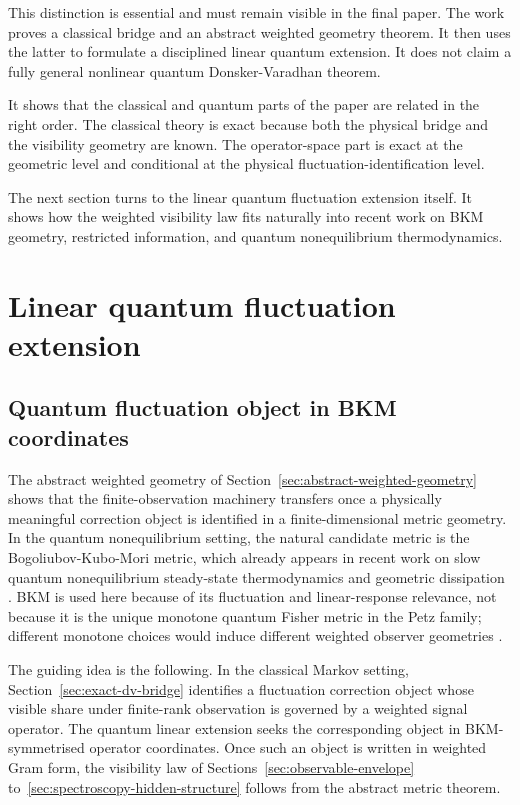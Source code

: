 \documentclass[11pt,a4paper]{article}
\numberwithin{equation}{section}
\theoremstyle{thmcompact}
\theoremstyle{remark}
\begin{document}
This distinction is essential and must remain visible in the final paper. The work proves a classical bridge and an abstract weighted geometry theorem. It then uses the latter to formulate a disciplined linear quantum extension. It does not claim a fully general nonlinear quantum Donsker-Varadhan theorem.

It shows that the classical and quantum parts of the paper are related in the right order. The classical theory is exact because both the physical bridge and the visibility geometry are known. The operator-space part is exact at the geometric level and conditional at the physical fluctuation-identification level.

The next section turns to the linear quantum fluctuation extension itself. It shows how the weighted visibility law fits naturally into recent work on BKM geometry, restricted information, and quantum nonequilibrium thermodynamics.

\section{Linear quantum fluctuation extension}
\label{sec:linear-quantum-fluctuation-extension}

\subsection{Quantum fluctuation object in BKM coordinates}

The abstract weighted geometry of Section~\ref{sec:abstract-weighted-geometry} shows that the finite-observation machinery transfers once a physically meaningful correction object is identified in a finite-dimensional metric geometry. In the quantum nonequilibrium setting, the natural candidate metric is the Bogoliubov-Kubo-Mori metric, which already appears in recent work on slow quantum nonequilibrium steady-state thermodynamics and geometric dissipation \cite{LacerdaBettmannGoold2025,BettmannGoold2025,Wirth2025}. BKM is used here because of its fluctuation and linear-response relevance, not because it is the unique monotone quantum Fisher metric in the Petz family; different monotone choices would induce different weighted observer geometries \cite{Petz1996}.

The guiding idea is the following. In the classical Markov setting, Section~\ref{sec:exact-dv-bridge} identifies a fluctuation correction object whose visible share under finite-rank observation is governed by a weighted signal operator. The quantum linear extension seeks the corresponding object in BKM-symmetrised operator coordinates. Once such an object is written in weighted Gram form, the visibility law of Sections~\ref{sec:observable-envelope} to~\ref{sec:spectroscopy-hidden-structure} follows from the abstract metric theorem.
\end{document}
